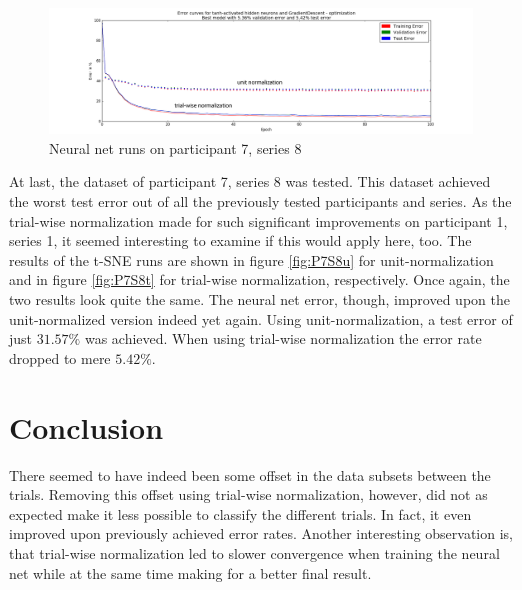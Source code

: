 \documentclass{article} %
\begin{document}
\begin{figure}[h]
	\centering
	\hspace*{-1.7cm}
	\includegraphics[width=1.25\textwidth]{P7S8_double.png}
	\caption{Neural net runs on participant 7, series 8}
	\label{fig:P7S8_double}
\end{figure}
At last, the dataset of participant 7, series 8 was tested. This dataset achieved the worst test error out of all the previously tested participants and series. As the trial-wise normalization made for such significant improvements on participant 1, series 1, it seemed interesting to examine if this would apply here, too. The results of the t-SNE runs are shown in figure \ref{fig:P7S8u} for unit-normalization and in figure \ref{fig:P7S8t} for trial-wise normalization, respectively. Once again, the two results look quite the same. The neural net error, though, improved upon the unit-normalized version indeed yet again. Using unit-normalization, a test error of just $31.57\%$ was achieved. When using trial-wise normalization the error rate dropped to mere $5.42\%$. 


\section{Conclusion}
There seemed to have indeed been some offset in the data subsets between the trials. Removing this offset using trial-wise normalization, however, did not as expected make it less possible to classify the different trials. In fact, it even improved upon previously achieved error rates. Another interesting observation is, that trial-wise normalization led to slower convergence when training the neural net while at the same time making for a better final result.
\end{document}
